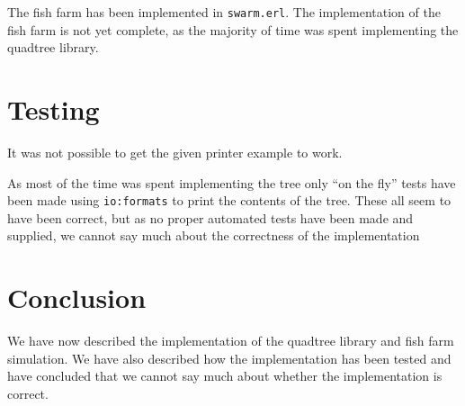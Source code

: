 \documentclass[a4paper, 11pt]{article}
\begin{document}
The fish farm has been implemented in \texttt{swarm.erl}. The implementation of the fish farm is not yet complete, as the majority of time was spent implementing the quadtree library.



\section{Testing} %
\label{sec:testing}

It was not possible to get the given printer example to work.

As most of the time was spent implementing the tree only ``on the fly'' tests have been made using \texttt{io:formats} to print the contents of the tree. These all seem to have been correct, but as no proper automated tests have been made and supplied, we cannot say much about the correctness of the implementation


\section{Conclusion} %
\label{sec:conclusion}

We have now described the implementation of the quadtree library and fish farm simulation. We have also described how the implementation has been tested and have concluded that we cannot say much about whether the implementation is correct.

\end{document}
